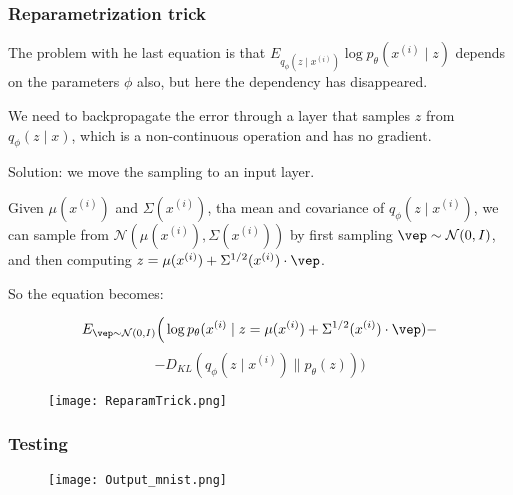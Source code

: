 \documentclass[t]{beamer}
\begin{document}
\begin{frame}
  \frametitle{Reparametrization trick}

  The problem with he last equation is that
  $E_{q_{\phi}(z\mid x^{(i)})}\log p_{\theta}(x^{(i)}\mid
  z)$ depends on the parameters $\phi$ also, but here the
  dependency has disappeared.

  \vspace{2mm}

  We need to backpropagate the error through a layer that
  samples $z$ from $q_{\phi}(z\mid x)$, which is a
  non-continuous operation and has no gradient.

  \vspace{2mm}

  Solution: we move the sampling to an input layer.

  \vspace{2mm}

  Given $\mu(x^{(i)})$ and $\Sigma(x^{(i)})$, tha mean and
  covariance of $q_{\phi}(z\mid x^{(i)})$, we can sample
  from $\mathcal{N}(\mu(x^{(i)}), \Sigma(x^{(i)}))$ by first
  sampling $\vep \sim \mathcal{N}(0,I)$, and then computing
  $z = \mu(x^{(i)})+ \Sigma^{1/2}(x^{(i)})\cdot \vep$.
\end{frame}

\begin{frame}
  So the equation becomes:

  \[
    E_{\vep \sim \mathcal{N}(0,I)}\Big(\log
    p_{\theta}(x^{(i)}\mid z = \mu(x^{(i)})+
    \Sigma^{1/2}(x^{(i)})\cdot \vep)-
  \]
  \[
    - D_{KL}(q_{\phi}(z\mid
    x^{(i)})\| p_{\theta}(z))\Big)
  \]

  
  \begin{figure}
   \texttt{[image: ReparamTrick.png]}
  \end{figure}
\end{frame}

\begin{frame}
  \frametitle{Testing}

  \begin{figure}
   \texttt{[image: Output\_mnist.png]}
  \end{figure}
\end{frame}
\end{document}
